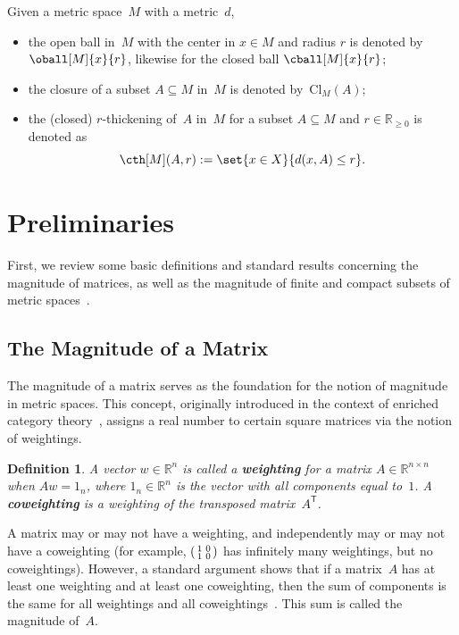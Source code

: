 \documentclass[11pt]{article}
\theoremstyle{plain}
\newtheorem{definition}[theorem]{Definition}
\theoremstyle{definition}
\newcommand{\df}[1]{\emph{\textbf{#1}}}  %
\newcommand{\RR}{\mathbb{R}}
\newcommand{\transpose}{{\mathsf{T}}}
\newcommand{\cl}[1][]{\mathrm{Cl}_{#1}}
\begin{document}
Given a metric space~$M$ with a metric~$d$,
\begin{itemize}
\item
the open ball in~$M$ with the center in $x \in M$ and radius $r$ is denoted by $\oball[M]{x}{r}$, likewise for the closed ball $\cball[M]{x}{r}$;
\item
the closure of a subset $A \subseteq M$ in~$M$ is denoted by~$\cl[M](A)$;
\item
the (closed) $r$-thickening of~$A$ in~$M$ for a subset $A \subseteq M$ and $r \in \RR_{\geq 0}$ is denoted as
\[\cth[M](A, r) := \set{x \in X}{d(x, A) \leq r}.\]
\end{itemize}


\section{Preliminaries}\label{section:prelims}

First, we review some basic definitions and standard results concerning the magnitude of matrices, as well as the magnitude of finite and compact subsets of metric spaces~\cite{leinster2010,meckes2013}.

\subsection{The Magnitude of a Matrix} 

The magnitude of a matrix serves as the foundation for the notion of magnitude in metric spaces. This concept, originally introduced in the context of enriched category theory~\cite{leinster2010}, assigns a real number to certain square matrices via the notion of weightings.

\begin{definition} 
A vector $w \in \RR^n$ is called a \df{weighting} for a matrix $A \in \RR^{n \times n}$ when $A w = 1_n$, where $1_n \in \RR^n$ is the vector with all components equal to~$1$. A \df{coweighting} is a weighting of the transposed matrix~$A^\transpose$.
\end{definition}


A matrix may or may not have a weighting, and independently may or may not have a coweighting (for example, $\begin{psmallmatrix} 1 & 0 \\ 1 & 0 \end{psmallmatrix}$ has infinitely many weightings, but no coweightings). However, a standard argument shows that if a matrix~$A$ has at least one weighting and at least one coweighting, then the sum of components is the same for all weightings and all coweightings~\cite[Lemma~1.1.2]{leinster2010}. This sum is called the magnitude of~$A$.
\end{document}
